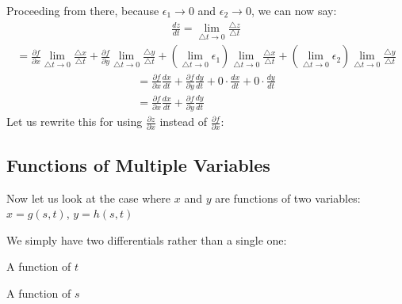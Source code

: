 \documentclass[12pt]{article}
\begin{document}
Proceeding from there, because \(\epsilon_1 \rightarrow 0\) and \(\epsilon_2 \rightarrow 0\), we can now say:
\begin{align}
	\frac{dz}{dt}=\lim_{\triangle t \to 0} \frac{\triangle z}{\triangle t}
\end{align}
\begin{align}
	= \frac{\partial f}{\partial x} \lim_{\triangle t \to 0} \frac{\triangle x}{\triangle t} + \frac{\partial f}{\partial y} \lim_{\triangle t \to 0} \frac{\triangle y}{\triangle t} + (\lim_{\triangle t \to 0} \epsilon_1)\lim_{\triangle t \to 0} \frac{\triangle x}{\triangle t} + (\lim_{\triangle t \to 0} \epsilon_2) \lim_{\triangle t \to 0} \frac{\triangle y}{\triangle t}
\end{align}
\begin{align}
	= \frac{\partial f}{\partial x} \frac{dx}{dt} + \frac{\partial f}{\partial y} \frac{dy}{dt}+ 0 \cdot \frac{dx}{dt}+0\cdot \frac{dy}{dt}\\
	=\frac{\partial f}{\partial x} \frac{dx}{dt}+ \frac{\partial f}{\partial y} \frac{dy}{dt}
\end{align}
Let us rewrite this for using \(\frac{\partial z}{\partial x} \) instead of \(\frac{\partial f}{\partial x} \):

\fbox{
	\begin{minipage}{1.6in}
		\[
			\frac{dz}{dt} = \frac{\partial z}{\partial x} \frac{dx}{dt} + \frac{\partial z}{\partial y} \frac{dy}{dt}
		\]
	\end{minipage}
}

\subsection{Functions of Multiple Variables}
Now let us look at the case where \(x\) and \(y\) are functions of two variables: \(x = g(s,t)\), \(y=h(s,t)\)

We simply have two differentials rather than a single one:

\noindent\fbox{%
	\begin{minipage}{1.6in}
		\[
			\frac{\partial z}{\partial s} = \frac{\partial f}{\partial x} \frac{dx}{ds}+ \frac{\partial f}{\partial y} \frac{dy}{ds}
		\]
	\end{minipage}	
}
A function of \(t\) 

\noindent\fbox{%
	\begin{minipage}{1.6in}
		\[
			\frac{\partial z}{\partial t} = \frac{\partial f}{\partial x} \frac{dx}{dt}+ \frac{\partial f}{\partial y} \frac{dy}{dt}
		\]
	\end{minipage}	
}
A function of \(s\)
\end{document}
